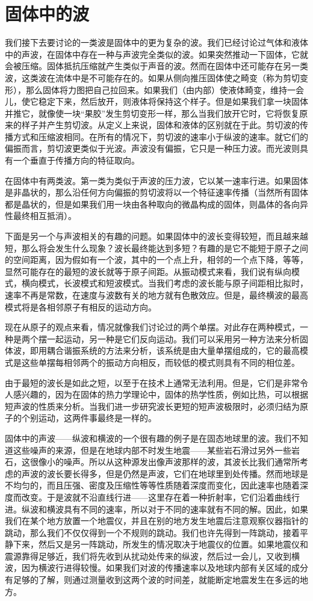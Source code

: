 \section{固体中的波}

我们接下去要讨论的一类波是固体中的更为复杂的波。我们已经讨论过气体和液体中的声波，在固体中存在一种与声波完全类似的波。如果突然推动一下固体，它就会被压缩。固体抵抗压缩就产生类似于声音的波。然而在固体中还可能存在另一类波，这类波在流体中是不可能存在的。如果从侧向推压固体使之畸变（称为剪切变形），那么固体将力图把自己拉回来。如果我们（由内部）使液体畸变，维持一会儿，使它稳定下来，然后放开，则液体将保持这个样子。但是如果我们拿一块固体并推它，就像使一块“果胶”发生剪切变形一样，那么当我们放开它时，它将恢复原来的样子并产生剪切波。从定义上来说，固体和液体的区别就在于此。剪切波的传播方式和压缩波相同。在所有的情况下，剪切波的速率小于纵波的速率。就它们的偏振而言，剪切波更类似于光波。声波没有偏振，它只是一种压力波。而光波则具有一个垂直于传播方向的特征取向。

在固体中有两类波。第一类为类似于声波的压力波，它以某一速率行进。如果固体是非晶状的，那么沿任何方向偏振的剪切波将以一个特征速率传播（当然所有固体都是晶状的，但是如果我们用一块由各种取向的微晶构成的固体，则晶体的各向异性最终相互抵消）。

下面是另一个与声波相关的有趣的问题。如果固体中的波长变得较短，而且越来越短，那么将会发生什么现象？波长最终能达到多短？有趣的是它不能短于原子之间的空间距离，因为假如有一个波，其中的一个点上升，相邻的一个点下降，等等，显然可能存在的最短的波长就等于原子间距。从振动模式来看，我们说有纵向模式，横向模式，长波模式和短波模式。当我们考虑的波长能与原子间距相比拟时，速率不再是常数，在速度与波数有关的地方就有色散效应。但是，最终横波的最高模式将是各相邻原子有相反的运动方向。

现在从原子的观点来看，情况就像我们讨论过的两个单摆。对此存在两种模式，一种是两个摆一起运动，另一种是它们反向运动。我们可以采用另一种方法来分析固体波，即用耦合谐振系统的方法来分析，该系统是由大量单摆组成的，它的最高模式是这些单摆每相邻两个的振动方向相反，而较低的模式则具有不同的相位差。

由于最短的波长是如此之短，以至于在技术上通常无法利用。但是，它们是非常令人感兴趣的，因为在固体的热力学理论中，固体的热学性质，例如比热，可以根据短声波的性质来分析。当我们进一步研究波长更短的短声波极限时，必须归结为原子的个别运动，这两件事最终是一样的。

固体中的声波——纵波和横波的一个很有趣的例子是在固态地球里的波。我们不知道这些噪声的来源，但是在地球内部不时发生地震——某些岩石滑过另外一些岩石，这很像小的噪声。所以从这种源发出像声波那样的波，其波长比我们通常所考虑的声波的波长要长得多，但是仍然是声波，它们在地球里到处传播。然而地球是不均匀的，而且压强、密度及压缩性等等性质随着深度而变化，因此速率也随着深度而改变。于是波就不沿直线行进——这里存在着一种折射率，它们沿着曲线行进。纵波和横波具有不同的速率，所以对于不同的速率就有不同的解。因此，如果我们在某个地方放置一个地震仪，并且在别的地方发生地震后注意观察仪器指针的跳动，那么我们不仅仅得到一个不规则的跳动。我们也许先得到一阵跳动，接着平静下来，然后又是另一阵跳动，所发生的情况取决于地震仪的位置。如果地震仪和震源靠得足够近，我们将先收到从扰动处传来的纵波，然后过一会儿，又收到横波，因为横波行进得较慢。如果我们对波的传播速率以及地球内部有关区域的成分有足够的了解，则通过测量收到这两个波的时间差，就能断定地震发生在多远的地方。

